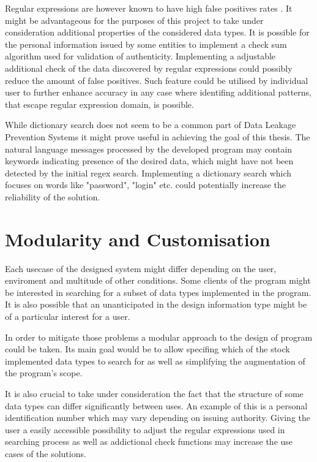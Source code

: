 \documentclass[a4paper,twoside,12pt]{book}
\begin{document}
Regular expressions are however known to have high false positives rates \cite{bib:articleDLPS}. It might be advantageous for the purposes of this project 
to take under consideration additional properties of the considered data types. It is possible for the personal information issued
by some entities to implement a check sum algorithm used for validation of authenticity. Implementing a adjustable additional check 
of the data discovered by regular expressions could possibly reduce the amount of false positives. Such feature could be utilised by 
individual user to further enhance accuracy in any case where identifing additional patterns, that escape regular expression domain, is possible.

While dictionary search does not seem to be a common part of Data Leakage Prevention Systems it might prove useful in achieving the goal of this thesis.
The natural language messages processed by the developed program may contain keywords indicating presence of the desired data, which might have not been 
detected by the initial regex search. Implementing a dictionary search which focuses on words like "password", "login" etc. could potentially increase the
reliability of the solution. 

\section{Modularity and Customisation}

Each usecase of the designed system might differ depending on the user, enviroment and multitude of other conditions. 
Some clients of the program might be interested in searching for a subset of data types implemented in the program. It is
also possible that an unanticipated in the design information type might be of a particular interest for a user. 

In order to mitigate those problems a modular approach to the design of program could be taken. Its main goal would be to allow specifing
which of the stock implemented data types to search for as well as simplifying the augmentation of the program's scope.

It is also crucial to take under consideration the fact that the structure of some data types can differ significantly between uses.
An example of this is a personal identification number which may vary depending on issuing authority. Giving the user a easily accessible possibility to 
adjust the regular expressions used in searching process as well as addictional check functions may increase the use cases of the solutions.
\end{document}
